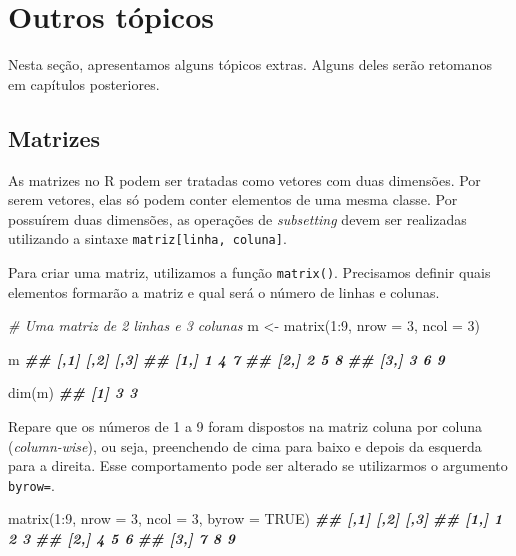 \documentclass[
]{book}
\newenvironment{Shaded}{\begin{snugshade}}{\end{snugshade}}
\newcommand{\AttributeTok}[1]{\textcolor[rgb]{0.77,0.63,0.00}{#1}}
\newcommand{\CommentTok}[1]{\textcolor[rgb]{0.56,0.35,0.01}{\textit{#1}}}
\newcommand{\ConstantTok}[1]{\textcolor[rgb]{0.00,0.00,0.00}{#1}}
\newcommand{\DecValTok}[1]{\textcolor[rgb]{0.00,0.00,0.81}{#1}}
\newcommand{\DocumentationTok}[1]{\textcolor[rgb]{0.56,0.35,0.01}{\textbf{\textit{#1}}}}
\newcommand{\FunctionTok}[1]{\textcolor[rgb]{0.00,0.00,0.00}{#1}}
\newcommand{\NormalTok}[1]{#1}
\newcommand{\OtherTok}[1]{\textcolor[rgb]{0.56,0.35,0.01}{#1}}
\newcommand{\SpecialCharTok}[1]{\textcolor[rgb]{0.00,0.00,0.00}{#1}}
\begin{document}
\hypertarget{outros-tuxf3picos}{%
\section{Outros tópicos}\label{outros-tuxf3picos}}

Nesta seção, apresentamos alguns tópicos extras. Alguns deles serão retomanos em capítulos posteriores.

\hypertarget{matrizes}{%
\subsection{Matrizes}\label{matrizes}}

As matrizes no R podem ser tratadas como vetores com duas dimensões. Por serem vetores, elas só podem conter elementos de uma mesma classe. Por possuírem duas dimensões, as operações de \emph{subsetting} devem ser realizadas utilizando a sintaxe \texttt{matriz{[}linha,\ coluna{]}}.

Para criar uma matriz, utilizamos a função \texttt{matrix()}. Precisamos definir quais elementos formarão a matriz e qual será o número de linhas e colunas.

\begin{Shaded}
\begin{Highlighting}[]
\CommentTok{\# Uma matriz de 2 linhas e 3 colunas}
\NormalTok{m }\OtherTok{\textless{}{-}} \FunctionTok{matrix}\NormalTok{(}\DecValTok{1}\SpecialCharTok{:}\DecValTok{9}\NormalTok{, }\AttributeTok{nrow =} \DecValTok{3}\NormalTok{, }\AttributeTok{ncol =} \DecValTok{3}\NormalTok{)}

\NormalTok{m}
\DocumentationTok{\#\#      [,1] [,2] [,3]}
\DocumentationTok{\#\# [1,]    1    4    7}
\DocumentationTok{\#\# [2,]    2    5    8}
\DocumentationTok{\#\# [3,]    3    6    9}

\FunctionTok{dim}\NormalTok{(m)}
\DocumentationTok{\#\# [1] 3 3}
\end{Highlighting}
\end{Shaded}

Repare que os números de 1 a 9 foram dispostos na matriz coluna por coluna (\emph{column-wise}), ou seja, preenchendo de cima para baixo e depois da esquerda para a direita. Esse comportamento pode ser alterado se utilizarmos o argumento \texttt{byrow=}.

\begin{Shaded}
\begin{Highlighting}[]
\FunctionTok{matrix}\NormalTok{(}\DecValTok{1}\SpecialCharTok{:}\DecValTok{9}\NormalTok{, }\AttributeTok{nrow =} \DecValTok{3}\NormalTok{, }\AttributeTok{ncol =} \DecValTok{3}\NormalTok{, }\AttributeTok{byrow =} \ConstantTok{TRUE}\NormalTok{)}
\DocumentationTok{\#\#      [,1] [,2] [,3]}
\DocumentationTok{\#\# [1,]    1    2    3}
\DocumentationTok{\#\# [2,]    4    5    6}
\DocumentationTok{\#\# [3,]    7    8    9}
\end{Highlighting}
\end{Shaded}
\end{document}
